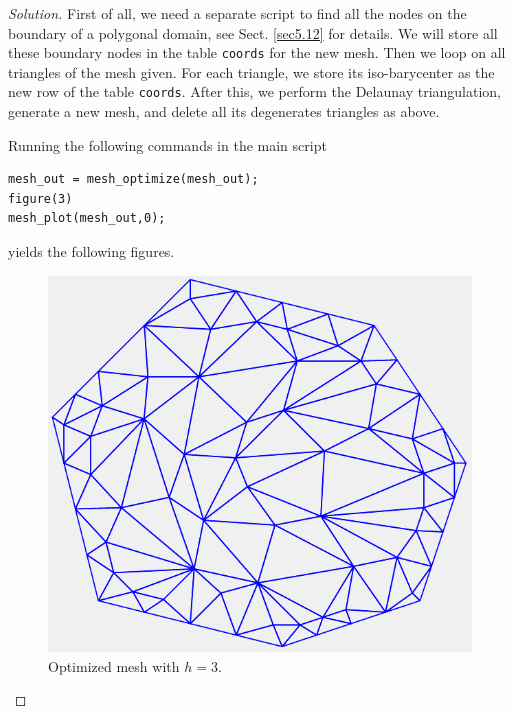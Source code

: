 \documentclass[11pt,a4paper,center,notitlepage]{article}
\numberwithin{equation}{section}
\begin{document}
\begin{proof}[Solution]
First of all, we need a separate script to find all the nodes on the boundary of a polygonal domain, see Sect. \ref{sec5.12} for details. We will store all these boundary nodes in the table \verb|coords| for the new mesh. Then we loop on all triangles of the mesh given. For each triangle, we store its iso-barycenter as the new row of the table \verb|coords|. After this, we perform the Delaunay triangulation, generate a new mesh, and delete all its degenerates triangles as above.

Running the following commands in the main script 
\begin{verbatim}
mesh_out = mesh_optimize(mesh_out);
figure(3)
mesh_plot(mesh_out,0);
\end{verbatim}
yields the following figures.
\begin{figure}[H]
\centering
\includegraphics[scale=0.9]{mesh_optimize_3}
\caption{Optimized mesh with $h=3$.}
\end{figure}


\end{proof}
\end{document}
